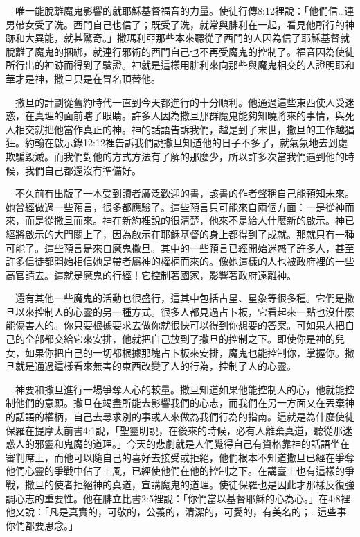 \documentclass{book}
\begin{document}
　唯一能脫離魔鬼影響的就耶穌基督福音的力量。使徒行傳8:12裡說：「他們信…連男帶女受了洗。西門自己也信了；既受了洗，就常與腓利在一起，看見他所行的神跡和大異能，就甚驚奇。」撒瑪利亞那些本來聽從了西門的人因為信了耶穌基督就脫離了魔鬼的捆綁，就連行邪術的西門自己也不再受魔鬼的控制了。福音因為使徒所行出的神跡而得到了驗證。神就是這樣用腓利來向那些與魔鬼相交的人證明耶和華才是神，撒旦只是在冒名頂替他。

　撒旦的計劃從舊約時代一直到今天都進行的十分順利。他通過這些東西使人受迷惑，在真理的面前瞎了眼睛。許多人因為撒旦那群魔鬼能夠知曉將來的事情，與死人相交就把他當作真正的神。神的話語告訴我們，越是到了末世，撒旦的工作越猖狂。約翰在啟示錄12:12裡告訴我們說撒旦知道他的日子不多了，就氣氛地去到處欺騙毀滅。而我們對他的方式方法有了解的那麼少，所以許多次當我們遇到他的時候，我們自己都還沒有準備好。

　不久前有出版了一本受到讀者廣泛歡迎的書，該書的作者聲稱自己能預知未來。她曾經做過一些預言，很多都應驗了。這些預言只可能來自兩個方面：一是從神而來，而是從撒旦而來。神在新約裡說的很清楚，他來不是給人什麼新的啟示。神已經將啟示的大門關上了，因為啟示在耶穌基督的身上都得到了成就。那就只有一種可能了。這些預言是來自魔鬼撒旦。其中的一些預言已經開始迷惑了許多人，甚至許多信徒都開始相信她是帶者屬神的權柄而來的。像她這樣的人也被政府裡的一些高官請去。這就是魔鬼的行經！它控制著國家，影響著政府遠離神。

　還有其他一些魔鬼的活動也很盛行，這其中包括占星、星象等很多種。它們是撒旦以來控制人的心靈的另一種方式。很多人都見過占卜板，它看起來一點也沒什麼能傷害人的。你只要根據要求去做你就很快可以得到你想要的答案。可如果人把自己的全部都交給它來安排，他就把自己放到了撒旦的控制之下。即使你是神的兒女，如果你把自己的一切都根據那塊占卜板來安排，魔鬼也能控制你，掌握你。撒旦就是通過這樣看來無害的東西改變了人的行為，控制了人的心靈。

　神要和撒旦進行一場爭奪人心的較量。撒旦知道如果他能控制人的心，他就能控制他們的意願。撒旦在竭盡所能去影響我們的心志，而我們在另一方面又在丟棄神的話語的權柄，自己去尋求別的事或人來做為我們行為的指南。這就是為什麼使徒保羅在提摩太前書4:1說，「聖靈明說，在後來的時候，必有人離棄真道，聽從那迷惑人的邪靈和鬼魔的道理。」今天的悲劇就是人們覺得自己有資格靠神的話語坐在審判席上，而他可以隨自己的喜好去接受或拒絕，他們根本不知道撒旦已經在爭奪他們心靈的爭戰中佔了上風，已經使他們在他的控制之下。在講臺上也有這樣的爭戰，撒旦的使者拒絕神的真道，宣講魔鬼的道理。使徒保羅也是因此才那樣反復強調心志的重要性。他在腓立比書2:5裡說：「你們當以基督耶穌的心為心。」在4:8裡他又說：「凡是真實的，可敬的，公義的，清潔的，可愛的，有美名的；…這些事你們都要思念。」
\end{document}

